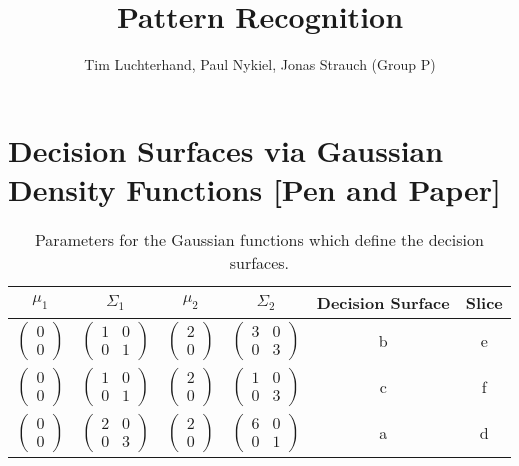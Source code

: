 \documentclass[DIN, pagenumber=false, fontsize=11pt, parskip=half]{scrartcl}
\title{Pattern Recognition}
\author{Tim Luchterhand, Paul Nykiel, Jonas Strauch (Group P)}
\begin{document}
    \maketitle
    \section{Decision Surfaces via Gaussian Density Functions [Pen and Paper]}
    \begin{table}[H]
        \centering
        \begin{tabular}{cccccc}
            \toprule
            $\mu_1$ & $\Sigma_1$ & $\mu_2$ & $\Sigma_2$ & Decision Surface & Slice \\
            \midrule
            $\begin{pmatrix} 0 \\ 0 \end{pmatrix}$ & $\begin{pmatrix} 1 & 0 \\ 0 & 1 \end{pmatrix}$ &
                $\begin{pmatrix} 2 \\ 0 \end{pmatrix}$ & $\begin{pmatrix} 3 & 0 \\ 0 & 3 \end{pmatrix}$ &
                   b & e  \\
            $\begin{pmatrix} 0 \\ 0 \end{pmatrix}$ & $\begin{pmatrix} 1 & 0 \\ 0 & 1 \end{pmatrix}$ &
                $\begin{pmatrix} 2 \\ 0 \end{pmatrix}$ & $\begin{pmatrix} 1 & 0 \\ 0 & 3 \end{pmatrix}$ &
                   c & f \\
            $\begin{pmatrix} 0 \\ 0 \end{pmatrix}$ & $\begin{pmatrix} 2 & 0 \\ 0 & 3 \end{pmatrix}$ &
                $\begin{pmatrix} 2 \\ 0 \end{pmatrix}$ & $\begin{pmatrix} 6 & 0 \\ 0 & 1 \end{pmatrix}$ &
                   a & d \\
            \bottomrule
        \end{tabular}
        \caption{Parameters for the Gaussian functions which define the decision surfaces.}
    \end{table}
    
\end{document}
